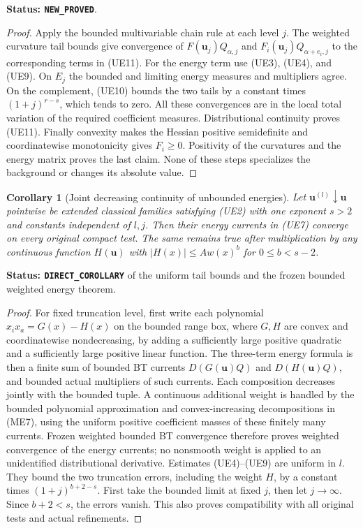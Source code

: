 \documentclass[11pt,a4paper]{article}
\numberwithin{equation}{section}
\newtheorem{corollary}[theorem]{Corollary}
\theoremstyle{definition}
\theoremstyle{remark}
\begin{document}
\noindent\textbf{Status: \texttt{NEW\_PROVED}}.

\begin{proof}
Apply the bounded multivariable chain rule at each level $j$.
The weighted curvature tail bounds give convergence of
$F(\mathbf u_j)Q_{\alpha,j}$ and
$F_i(\mathbf u_j)Q_{\alpha+e_i,j}$ to the corresponding terms
in (UE11).  For the energy term use (UE3), (UE4), and (UE9).
On $E_j$ the bounded and limiting energy measures and multipliers
agree.  On the complement, (UE10) bounds the two tails by a constant
times $(1+j)^{r-s}$, which tends to zero.  All these convergences
are in the local total variation of the required coefficient
measures.  Distributional continuity proves (UE11).
Finally convexity makes the Hessian positive semidefinite and
coordinatewise monotonicity gives $F_i\geq0$.  Positivity of the
curvatures and the energy matrix proves the last claim.  None of
these steps specializes the background or changes its absolute value.
\end{proof}

\begin{corollary}[Joint decreasing continuity of unbounded energies]
\label{cor:r11-unbounded-energy-decreasing}
Let $\mathbf u^{(l)}\downarrow\mathbf u$ pointwise be extended
classical families satisfying (UE2) with one exponent $s>2$ and
constants independent of $l,j$.  Then their energy currents in
(UE7) converge on every original compact test.  The same remains
true after multiplication by any continuous function $H(\mathbf u)$
with $|H(x)|\leq A w(x)^b$ for $0\leq b<s-2$.
\end{corollary}

\noindent\textbf{Status: \texttt{DIRECT\_COROLLARY}} of the
uniform tail bounds and the frozen bounded weighted energy theorem.

\begin{proof}
For fixed truncation level, first write each polynomial
$x_i x_a=G(x)-H(x)$ on the bounded range box, where $G,H$ are
convex and coordinatewise nondecreasing, by adding a sufficiently
large positive quadratic and a sufficiently large positive linear
function.  The three-term energy formula is then a finite sum of
bounded BT currents $D(G(\mathbf u)Q)$ and $D(H(\mathbf u)Q)$,
and bounded actual multipliers of such currents.  Each composition
decreases jointly with the bounded tuple.  A continuous additional
weight is handled by the bounded polynomial approximation and
convex-increasing decompositions in (ME7), using the uniform positive
coefficient masses of these finitely many currents.  Frozen weighted
bounded BT convergence therefore proves weighted convergence of the
energy currents; no nonsmooth weight is applied to an unidentified
distributional derivative.  Estimates (UE4)--(UE9) are uniform
in $l$.  They bound the two truncation errors, including the weight
$H$, by a constant times $(1+j)^{b+2-s}$.  First take the bounded
limit at fixed $j$, then let $j\to\infty$.  Since $b+2<s$,
the errors vanish.  This also proves compatibility with all original
tests and actual refinements.
\end{proof}
\end{document}

